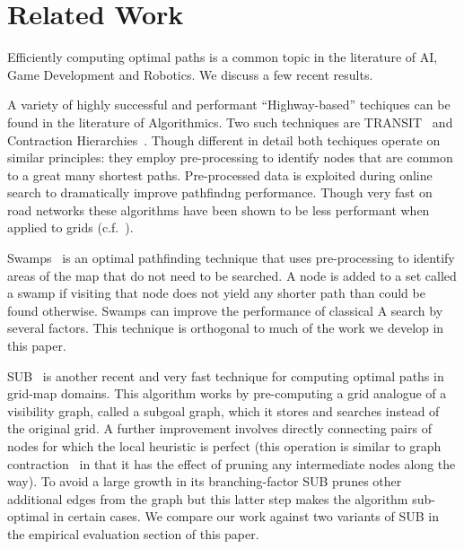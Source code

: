 \section{Related Work}
\label{sec::relatedwork}
Efficiently computing optimal paths is a common topic
in the literature of AI, Game Development and 
Robotics. We discuss a few recent results.

A variety of highly successful and performant ``Highway-based'' 
techiques can be found in the literature of Algorithmics. 
Two such techniques are TRANSIT~\cite{bast06} and Contraction
Hierarchies~\cite{geisberger08}. Though different in detail
both techiques operate on similar principles: they employ
pre-processing to identify nodes that
are common to a great many shortest paths. Pre-processed data is
exploited during online search to dramatically improve pathfindng 
performance. Though very fast on road networks these algorithms have
been shown to be less performant when applied to grids 
(c.f.~\cite{sturtevant10,antsfeld12,storandt13}).

Swamps~\cite{pochter10} is an optimal pathfinding technique
that uses pre-processing to identify areas of the map that do 
not need to be searched. A node is added to a set called a swamp
if visiting that node does not yield any shorter path than could
be found otherwise. Swamps can improve the performance of classical
A\* search by several factors. This technique is orthogonal to much
of the work we develop in this paper.

SUB~\cite{urasKH13} is another recent and very fast technique 
for computing optimal paths in grid-map domains. 
This algorithm works by pre-computing a grid analogue of a visibility graph,
called a subgoal graph, which it stores and searches instead of the original
grid.
A further improvement involves directly connecting pairs of nodes
for which the local heuristic is perfect (this operation is similar 
to graph contraction~\cite{geisberger08} in that it has the effect of 
pruning any intermediate nodes along the way).
To avoid a large growth in its branching-factor SUB prunes other 
additional edges from the graph but this latter step makes the 
algorithm sub-optimal in certain cases. We compare our work against
two variants of SUB in the empirical evaluation section of this paper.

%
